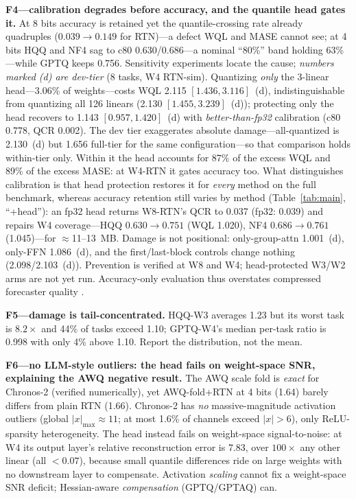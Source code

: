 \documentclass{article}
\begin{document}
\vspace{1pt}\noindent\textbf{F4---calibration degrades before accuracy, and the quantile
head gates it.} At 8 bits accuracy is retained yet the quantile-crossing rate already
quadruples ($0.039\to0.149$ for RTN)---a defect WQL and MASE cannot see; at 4 bits HQQ
and NF4 sag to c80 0.630/0.686---a nominal ``80\%'' band holding 63\%---while GPTQ keeps
0.756. Sensitivity experiments locate the cause; \emph{numbers marked (d) are dev-tier}
(8 tasks, W4 RTN-sim). Quantizing \emph{only} the 3-linear head---3.06\% of
weights---costs WQL 2.115 $[1.436,3.116]$~(d), indistinguishable from quantizing all 126
linears (2.130 $[1.455,3.239]$~(d)); protecting only the head recovers to 1.143
$[0.957,1.420]$~(d) with \emph{better-than-fp32} calibration (c80 0.778, QCR 0.002). The
dev tier exaggerates absolute damage---all-quantized is 2.130~(d) but 1.656 full-tier for
the same configuration---so that comparison holds within-tier only. Within it the head
accounts for 87\% of the excess WQL and 89\% of the excess MASE: at W4-RTN it gates
accuracy too. What distinguishes calibration is that head protection restores it for
\emph{every} method on the full benchmark, whereas accuracy retention still varies by
method (Table~\ref{tab:main}, ``+head''): an fp32 head returns W8-RTN's QCR to 0.037
(fp32: 0.039) and repairs W4 coverage---HQQ $0.630\to0.751$ (WQL 1.020), NF4
$0.686\to0.761$ (1.045)---for $\approx$11--13~MB. Damage is not positional:
only-group-attn 1.001~(d), only-FFN 1.086~(d), and the first/last-block controls change
nothing (2.098/2.103~(d)). Prevention is verified at W8 and W4; head-protected W3/W2 arms
are not yet run. Accuracy-only evaluation thus overstates compressed forecaster quality
\citep{accuracy}.

\vspace{1pt}\noindent\textbf{F5---damage is tail-concentrated.} HQQ-W3 averages 1.23 but
its worst task is $8.2\times$ and 44\% of tasks exceed 1.10; GPTQ-W4's median per-task
ratio is 0.998 with only 4\% above 1.10. Report the distribution, not the mean.

\vspace{1pt}\noindent\textbf{F6---no LLM-style outliers: the head fails on weight-space
SNR, explaining the AWQ negative result.} The AWQ scale fold is \emph{exact} for
Chronos-2 (verified numerically), yet AWQ-fold+RTN at 4 bits (1.64) barely differs from
plain RTN (1.66). Chronos-2 has \emph{no} massive-magnitude activation outliers (global
$|x|_{\max}\!\approx\!11$; at most 1.6\% of channels exceed $|x|{>}6$), only
ReLU-sparsity heterogeneity. The head instead fails on weight-space signal-to-noise: at
W4 its output layer's relative reconstruction error is 7.83, over $100\times$ any other
linear (all $<0.07$), because small quantile differences ride on large weights with no
downstream layer to compensate. Activation \emph{scaling} cannot fix a weight-space SNR
deficit; Hessian-aware \emph{compensation} (GPTQ/GPTAQ) can.
\end{document}
